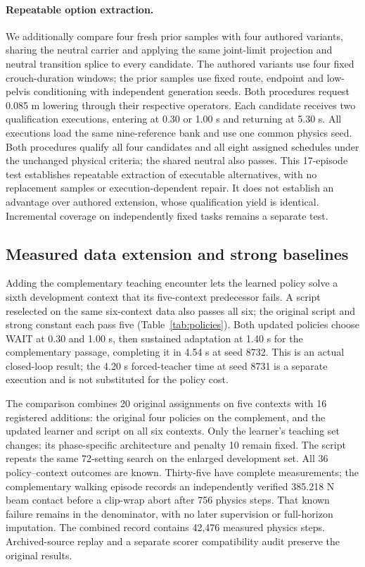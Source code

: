 \documentclass[10pt]{article}
\begin{document}
\paragraph{Repeatable option extraction.}
We additionally compare four fresh prior samples with four authored variants,
sharing the neutral carrier and applying the same joint-limit projection and
neutral transition splice to every candidate. The authored variants use four
fixed crouch-duration windows; the prior samples use fixed route, endpoint and
low-pelvis conditioning with independent generation seeds. Both procedures
request 0.085 m lowering through their respective operators. Each candidate
receives two qualification executions, entering at 0.30 or 1.00 s and returning
at 5.30 s. All executions load the same nine-reference bank and use one common
physics seed. Both procedures qualify all four candidates and all eight assigned
schedules under the unchanged physical criteria; the shared neutral also passes.
This 17-episode test establishes repeatable extraction of executable alternatives,
with no replacement samples or execution-dependent repair. It does not establish
an advantage over authored extension, whose qualification yield is identical.
Incremental coverage on independently fixed tasks remains a separate test.

\subsection{Measured data extension and strong baselines}
Adding the complementary teaching encounter lets the learned policy solve a
sixth development context that its five-context predecessor fails. A script
reselected on the same six-context data also passes all six; the original script
and strong constant each pass five (Table~\ref{tab:policies}). Both updated
policies choose WAIT at 0.30 and 1.00 s, then sustained adaptation at 1.40 s
for the complementary passage, completing it in 4.54 s at seed 8732. This is an
actual closed-loop result; the 4.20 s forced-teacher time at seed 8731 is a
separate execution and is not substituted for the policy cost.

The comparison combines 20 original assignments on five contexts with 16
registered additions: the original four policies on the complement, and the
updated learner and script on all six contexts. Only the learner's teaching set
changes; its phase-specific architecture and penalty 10 remain fixed. The script
repeats the same 72-setting search on the enlarged development set. All 36
policy--context outcomes are known. Thirty-five have complete measurements; the
complementary walking episode records an independently verified 385.218 N beam
contact before a clip-wrap abort after 756 physics steps. That known failure
remains in the denominator, with no later supervision or full-horizon imputation.
The combined record contains 42,476 measured physics steps. Archived-source replay
and a separate scorer compatibility audit preserve the original results.
\end{document}
